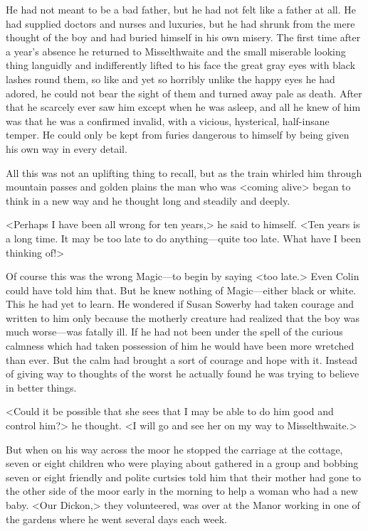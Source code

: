 He had not meant to be a bad father, but he had not felt like a father at all. He had supplied doctors and nurses and luxuries, but he had shrunk from the mere thought of the boy and had buried himself in his own misery. The first time after a year's absence he returned to Misselthwaite and the small miserable looking thing languidly and indifferently lifted to his face the great gray eyes with black lashes round them, so like and yet so horribly unlike the happy eyes he had adored, he could not bear the sight of them and turned away pale as death. After that he scarcely ever saw him except when he was asleep, and all he knew of him was that he was a confirmed invalid, with a vicious, hysterical, half-insane temper. He could only be kept from furies dangerous to himself by being given his own way in every detail.

All this was not an uplifting thing to recall, but as the train whirled him through mountain passes and golden plains the man who was <coming alive> began to think in a new way and he thought long and steadily and deeply.

<Perhaps I have been all wrong for ten years,> he said to himself. <Ten years is a long time. It may be too late to do anything—quite too late. What have I been thinking of!>

Of course this was the wrong Magic—to begin by saying <too late.> Even Colin could have told him that. But he knew nothing of Magic—either black or white. This he had yet to learn. He wondered if Susan Sowerby had taken courage and written to him only because the motherly creature had realized that the boy was much worse—was fatally ill. If he had not been under the spell of the curious calmness which had taken possession of him he would have been more wretched than ever. But the calm had brought a sort of courage and hope with it. Instead of giving way to thoughts of the worst he actually found he was trying to believe in better things.

<Could it be possible that she sees that I may be able to do him good and control him?> he thought. <I will go and see her on my way to Misselthwaite.>

But when on his way across the moor he stopped the carriage at the cottage, seven or eight children who were playing about gathered in a group and bobbing seven or eight friendly and polite curtsies told him that their mother had gone to the other side of the moor early in the morning to help a woman who had a new baby. <Our Dickon,> they volunteered, was over at the Manor working in one of the gardens where he went several days each week.


